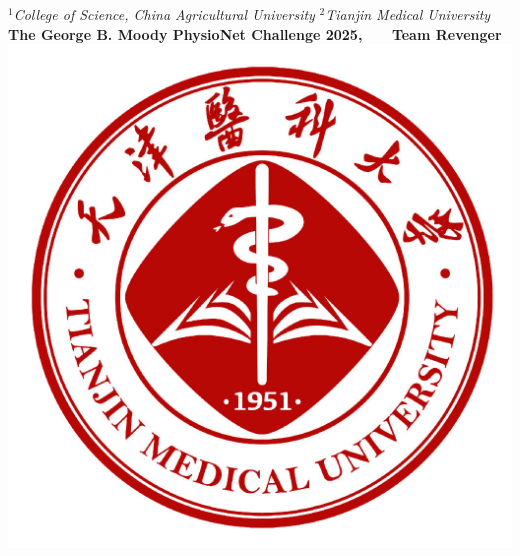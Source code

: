 \documentclass[a0paper,portrait]{baposter}
\begin{document}
\begin{poster}
{$^1${\it College of Science, China Agricultural University}\qquad
$^2${\it Tianjin Medical University} \\
\vspace{0.2cm}
{\Large \bf{The George B. Moody PhysioNet Challenge 2025}, ~~~\bf{Team Revenger}}
}
{\includegraphics[scale=0.101]{logo_tmu.jpeg}}


\newif\ifcoloredtext
\coloredtexttrue
\newif\ifboxednn
\boxednntrue






\end{poster}
\end{document}

